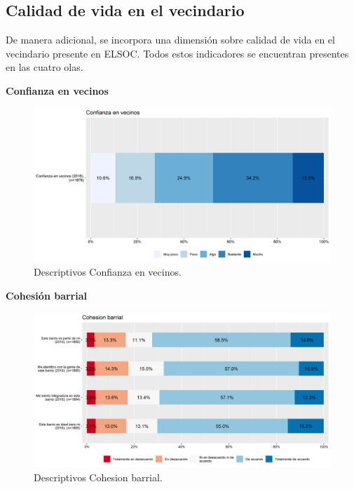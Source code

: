 \documentclass[
  12pt,
]{book}
\begin{document}
\hypertarget{calidad-de-vida-en-el-vecindario}{%
\subsection{Calidad de vida en el vecindario}\label{calidad-de-vida-en-el-vecindario}}

De manera adicional, se incorpora una dimensión sobre calidad de vida en el vecindario presente en ELSOC. Todos estos indicadores se encuentran presentes en las cuatro olas.

\textbf{Confianza en vecinos}

\begin{figure}[H]

{\centering \includegraphics[width=1\linewidth,height=1\textheight]{output/graphs/confianza-vecinos} 

}

\caption{Descriptivos Confianza en vecinos.}\label{fig:unnamed-chunk-3}
\end{figure}

\textbf{Cohesión barrial}

\begin{figure}[H]

{\centering \includegraphics[width=1\linewidth,height=1\textheight]{output/graphs/cohesion-barrial} 

}

\caption{Descriptivos Cohesion barrial.}\label{fig:unnamed-chunk-4}
\end{figure}
\end{document}
